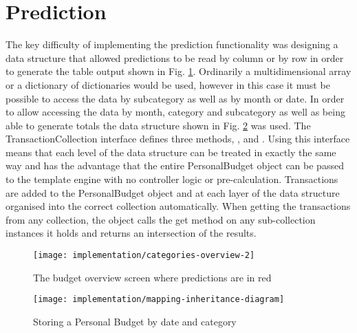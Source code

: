 \section{Prediction}
The key difficulty of implementing the prediction functionality was designing a data structure that allowed predictions to be read by column or by row in order to generate the table output shown in Fig. \ref{fig:imp-categories-overview}. Ordinarily a multidimensional array or a dictionary of dictionaries would be used, however in this case it must be possible to access the data by subcategory as well as by month or date.
%
In order to allow accessing the data by month, category and subcategory as well as being able to generate totals the data structure shown in Fig. \ref{fig:prediction-inheritance-diagram} was used. The TransactionCollection interface defines three methods, ,  and . Using this interface means that each level of the data structure can be treated in exactly the same way and has the advantage that the entire PersonalBudget object can be passed to the template engine with no controller logic or pre-calculation. Transactions are added to the PersonalBudget object and at each layer of the data structure organised into the correct collection automatically. When getting the transactions from any collection, the object calls the get  method on any sub-collection instances it holds and returns an intersection of the results.

\begin{figure}[h]
    \centering
    \texttt{[image: implementation/categories-overview-2]}
    \caption{The budget overview screen where predictions are in red}
    \label{fig:imp-categories-overview}
\end{figure}

\begin{figure}[h]
    \centering
    \texttt{[image: implementation/mapping-inheritance-diagram]}
    \caption{Storing a Personal Budget by date and category}
    \label{fig:prediction-inheritance-diagram}
    
    \begin{comment}
[PersonalBudget]<>1-2>[Budget]
[<<Abstract>> CategoryCollection]^-[Budget]
[<<Interface>>;TransactionCollection]^-[Budget]
[<<Abstract>>;CategoryCollection]^-[TransactionDateCollection]
[<<Interface>>;TransactionCollection]^-[TransactionDateCollection]
[Budget]<>1-0..*>[TransactionDateCollection]
[<<Abstract>>;CategoryCollection]^-[TransactionCategoryCollection]
[<<Interface>>;TransactionCollection]^-[TransactionCategoryCollection]
[TransactionDateCollection]<>1-0..*>[TransactionCategoryCollection]
[<<Abstract>>;CategoryCollection]^-[TransactionSubCategoryCollection]
[<<Interface>>;TransactionCollection]^-[TransactionSubCategoryCollection]
[TransactionCategoryCollection]<>1-0..*>[TransactionSubCategoryCollection]
[TransactionSubCategoryCollection]<>1-0..*>[Transaction]
    \end{comment}
\end{figure}

